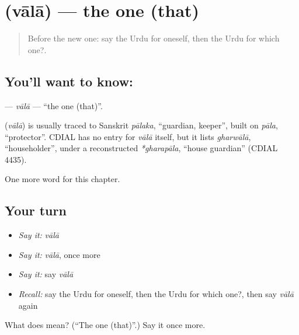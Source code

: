 \section[\texorpdfstring{\ur{والا} (vālā)}{والا (vālā)}]{ (vālā) — the one (that)}

\label{lesson:UR-C90-vala}



\begin{quote}
Before the new one: say the Urdu for oneself, then the Urdu for which one?.
\end{quote}

\subsection*{You'll want to know: }
\textbf{} — \emph{vālā} — \textquotedblleft{}the one (that)\textquotedblright{}.

\begin{cousinweb}
\textbf{} (\emph{vālā}) is usually traced to Sanskrit \emph{pālaka}, \textquotedblleft{}guardian, keeper\textquotedblright{}, built on \emph{pāla}, \textquotedblleft{}protector\textquotedblright{}. CDIAL has no entry for \emph{vālā} itself, but it lists \emph{gharwālā}, \textquotedblleft{}householder\textquotedblright{}, under a reconstructed \emph{*gharapāla}, \textquotedblleft{}house guardian\textquotedblright{} (CDIAL 4435).
\end{cousinweb}

\begin{grammarlens}[title={What you've built}]
One more word for this chapter.
\end{grammarlens}

\subsection*{Your turn}
\begin{itemize}
\raggedright
  \item \emph{Say it:} \emph{vālā}
  \item \emph{Say it:} \emph{vālā}, once more
  \item \emph{Say it:} say \emph{vālā}
  \item \emph{Recall:} say the Urdu for oneself, then the Urdu for which one?, then say \emph{vālā} again
\end{itemize}

\begin{tcolorbox}[breakable,colback=teal!4,colframe=teal!35!black,title={Before you move on}]
What does  mean? (\textquotedblleft{}The one (that)\textquotedblright{}.) Say it once more.
\end{tcolorbox}
